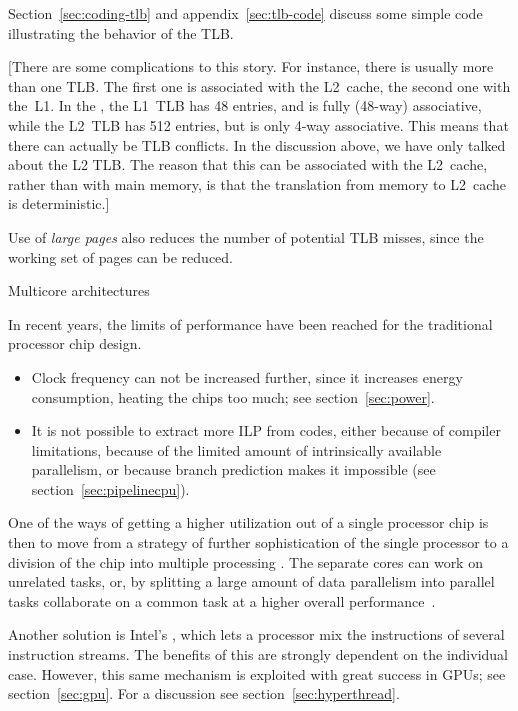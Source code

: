 Section~\ref{sec:coding-tlb} and appendix~\ref{sec:tlb-code} discuss
some simple code illustrating the
behavior of the \ac{TLB}.

[There are some complications to this story. For instance, there is
  usually more than one \ac{TLB}. The first one is associated with the
  L2~cache, the second one with the~L1. In the
  , the L1~\ac{TLB} has 48 entries, and
  is fully (48-way) associative, while the L2~\ac{TLB} has 512
  entries, but is only 4-way associative. This means that there can
  actually be \ac{TLB} conflicts. In the discussion above, we have
  only talked about the L2 \ac{TLB}. The reason that this can be
  associated with the L2~cache, rather than with main memory, is that
  the translation from memory to L2~cache is deterministic.]

Use of \emph{large pages} also reduces the
number of potential TLB misses, since the working set of pages can be
reduced.

 {Multicore architectures}
\label{sec:multicore}

In recent years, the limits of performance have been reached for the
traditional processor chip design.
\begin{itemize}
\item Clock frequency can not be increased further, since it increases
  energy consumption, heating the chips too
    much; see section~\ref{sec:power}. 
\item It is not possible to extract more \acf{ILP}
  from codes, either because of compiler limitations, because of the
  limited amount of intrinsically available parallelism, or because
  branch prediction makes it 
  impossible (see section~\ref{sec:pipelinecpu}).
\end{itemize}

One of the ways of getting a higher utilization out of a single
processor chip is then to move from a strategy of further
sophistication of the single processor to a division of the chip into
multiple processing .
The separate cores can work on unrelated tasks, or,
by splitting a large amount of data parallelism
into parallel tasks
collaborate on a common task at a higher
overall performance~\cite{Olukotun:1996:single-chip}.
\begin{remark}
Another solution is Intel's
  , which lets a processor mix the instructions of
  several instruction streams. The benefits of this are strongly
  dependent on the individual case. However, this same mechanism is
  exploited with great success in GPUs; see
  section~\ref{sec:gpu}. For a discussion see
  section~\ref{sec:hyperthread}.
\end{remark}

